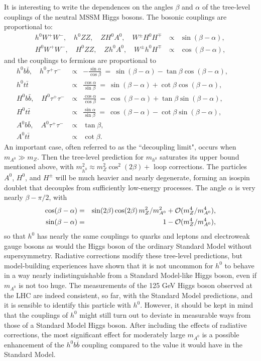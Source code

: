 \documentclass[12pt]{article}
\def\beq{\begin{eqnarray}}
\def\eeq{\end{eqnarray}}
\begin{document}
It is interesting to write the dependences on the angles $\beta$ and $\alpha$ of
the tree-level couplings of the neutral MSSM Higgs bosons. The 
bosonic couplings are proportional to:
\beq
h^0 W^+W^-,\quad h^0 ZZ,\quad Z H^0 A^0,\quad W^\pm H^0 H^\mp &\propto& \sin(\beta-\alpha)
,
\\
H^0 W^+W^-,\quad H^0 ZZ,\quad
Z h^0 A^0,\quad W^\pm h^0 H^\mp\> &\propto& \cos(\beta-\alpha),
\eeq
and the couplings to fermions are proportional to
\beq
h^0b\bar b,\quad h^0\tau^+\tau^-\> &\propto&-\frac{\sin\alpha}{\cos\beta}\>=\>
\sin(\beta-\alpha) - \tan\beta \cos(\beta-\alpha),\phantom{xxxx}
\\
h^0t\bar t\> &\propto& \frac{\cos\alpha}{\sin\beta}\>=\>
\sin(\beta-\alpha) + \cot\beta \cos(\beta-\alpha),
\\
H^0b\bar b,\quad H^0\tau^+\tau^-\> &\propto&\frac{\cos\alpha}{\cos\beta}\>=\>
\cos(\beta-\alpha) + \tan\beta \sin(\beta-\alpha),
\\
H^0t\bar t\> &\propto& \frac{\sin\alpha}{\sin\beta}\>=\>
\cos(\beta-\alpha) - \cot\beta \sin(\beta-\alpha),
\\
A^0b\bar b,\quad A^0\tau^+\tau^-\> &\propto& \tan\beta,
\\
A^0t\bar t\> &\propto& \cot\beta.
\eeq
An important case, often referred to as the ``decoupling limit", occurs 
when $m_{A^0} \gg m_Z$. Then the tree-level prediction for 
$m_{h^0}$ saturates its upper bound 
mentioned above, with $m^2_{h^0} \approx m_Z^2 \cos^2 (2\beta) + $ loop 
corrections. The particles $A^0$, $H^0$, and $H^\pm$ will be much heavier 
and nearly degenerate, forming an isospin doublet that decouples from 
sufficiently low-energy processes. The angle $\alpha$ is very nearly 
$\beta-\pi/2$, with
\beq
\cos(\beta-\alpha) &=& 
\sin(2\beta) \cos(2\beta)\, m_Z^2/m_{A^0}^2+
{\cal O}(m_Z^4/m_{A^0}^4),
\\
\sin(\beta-\alpha) &=& 1 - {\cal O}(m_Z^4/m_{A^0}^4),
\eeq
so that 
$h^0$ has nearly the same couplings to quarks and leptons and 
electroweak gauge bosons as would the Higgs boson of the ordinary 
Standard Model without supersymmetry. Radiative corrections modify these tree-level
predictions, but model-building experiences 
have shown that it is not uncommon for $h^0$ to behave in a way nearly 
indistinguishable from a Standard Model-like Higgs boson, even if 
$m_{A^0}$ is not too huge. The measurements of the 125 GeV Higgs boson observed  
at the LHC are indeed consistent, so far, with the Standard Model predictions,
and it is sensible to identify this particle with $h^0$.
However, it should be kept in mind that the 
couplings of $h^0$ might still turn out to deviate in measurable ways from those 
of a Standard Model Higgs boson. After including the effects of radiative corrections,
the most significant effect for moderately 
large $m_{A^0}$ is a possible enhancement of the $h^0 b \overline b$ 
coupling compared to the value it would have in the Standard Model.
\end{document}
